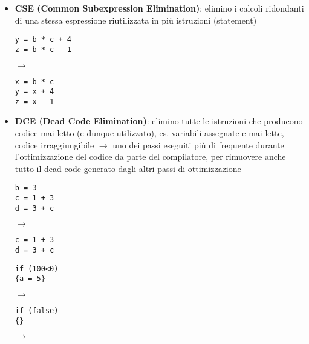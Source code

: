 \begin{itemize}
\item \textbf{CSE (Common Subexpression Elimination)}: elimino i calcoli ridondanti di una stessa espressione riutilizzata in pi\`u istruzioni (statement)\\
  \begin{minipage}[c]{.4\textwidth}
    \begin{lstlisting}
y = b * c + 4
z = b * c - 1\end{lstlisting}
  \end{minipage}
\hfill $\rightarrow$ \hfill
\begin{minipage}[c]{.4\textwidth}
\begin{lstlisting}
x = b * c
y = x + 4
z = x - 1\end{lstlisting}
\end{minipage}
\item \textbf{DCE (Dead Code Elimination)}: elimino tutte le istruzioni che producono codice mai letto (e dunque utilizzato), es. variabili assegnate e mai lette, codice irraggiungibile $\rightarrow$ uno dei passi eseguiti pi\`u di frequente durante l'ottimizzazione del codice da parte del compilatore, per rimuovere anche tutto il dead code generato dagli altri passi di ottimizzazione\\
  \begin{minipage}[c]{.4\textwidth}
  \begin{lstlisting}
b = 3
c = 1 + 3
d = 3 + c\end{lstlisting}
  \end{minipage}
  \hfill $\rightarrow$ \hfill
  \begin{minipage}[c]{.4\textwidth}
  \begin{lstlisting}
c = 1 + 3
d = 3 + c\end{lstlisting}
  \end{minipage}

  \begin{minipage}[c]{.25\textwidth}
  \begin{lstlisting}
if (100<0)
{a = 5}\end{lstlisting}
  \end{minipage}
  \hfill $\rightarrow$ \hfill
  \begin{minipage}[c]{.25\textwidth}
  \begin{lstlisting}
if (false)
{}\end{lstlisting}
  \end{minipage}
  \hfill $\rightarrow$ \hfill
  \begin{minipage}[c]{.25\textwidth}
  \begin{lstlisting}


\end{lstlisting}
\end{minipage}
\end{itemize}
